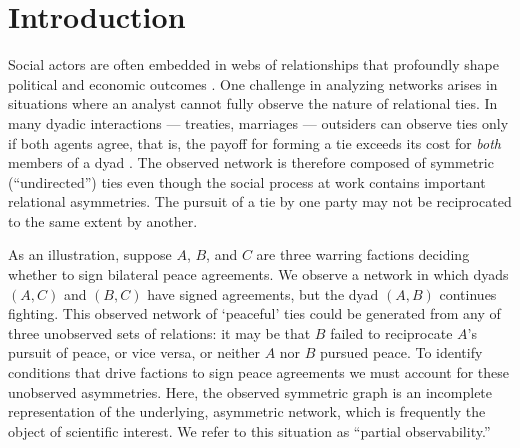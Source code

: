 \section{Introduction} %

Social actors are often embedded in webs of relationships that profoundly shape political and economic outcomes \citep{franzese:hays:2008,ward:etal:2011}. One challenge in analyzing networks arises in situations where an analyst cannot fully observe the nature of relational ties. In many dyadic interactions --- treaties, marriages --- outsiders can observe ties only if both agents agree, that is, the payoff for forming a tie exceeds its cost for \emph{both} members of a dyad \citep{jackson:wolinsky:1996}. The observed network is therefore composed of symmetric (``undirected'') ties even though the social process at work contains important relational asymmetries. The pursuit of a tie by one party may not be reciprocated to the same extent by another.

As an illustration, suppose $A$, $B$, and $C$ are three warring factions deciding whether to sign bilateral peace agreements. We observe a network in which dyads $(A, C)$ and $(B, C)$ have signed agreements, but the dyad $(A, B)$ continues fighting. This observed network of `peaceful' ties could be generated from any of  three unobserved sets of relations: it may be that $B$ failed to reciprocate $A$'s pursuit of peace, or vice versa, or neither $A$ nor $B$ pursued peace. To identify conditions that drive factions to sign peace agreements we must account for these unobserved asymmetries.  Here, the observed symmetric graph is an incomplete representation of the underlying, asymmetric network, which is frequently the object of scientific interest.  We refer to this situation as ``partial observability.'' 


